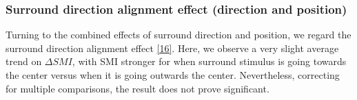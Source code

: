 \begin{table}[H]
\begin{center}\par
{}
 \caption{Three-way ANOVA results for the collinear versus flanking surround effect, iso-oriented versus cross-oriented C-S effect, and center stimulus (in regards to OS preference), as well as possible 2-way interactions.}
    \vspace{-5mm}
    \label{table2}
\end{center}
\end{table}

\subsubsection{Surround direction alignment effect (direction and position)}

Turning to the combined effects of surround direction and position, we regard the surround direction alignment effect \ref{16}. Here, we observe a very slight average trend on $\Delta SMI$, with SMI stronger for when surround stimulus is going towards the center versus when it is going outwards the center. Nevertheless, correcting for multiple comparisons, the result does not prove significant.


